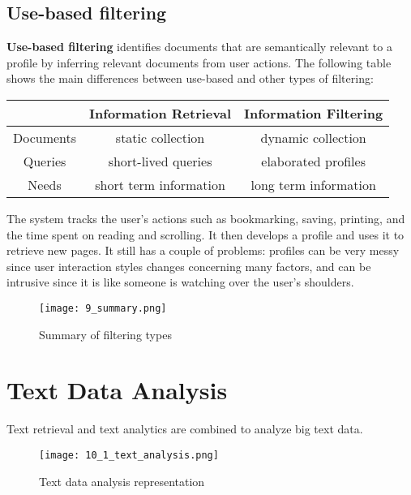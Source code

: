 \documentclass{article}
\begin{document}
\subsection{Use-based filtering}
\textbf{Use-based filtering} identifies documents that are semantically relevant to a profile by inferring relevant documents from user actions. The following table shows the main differences between use-based and other types of filtering:
\begin{center}
    \begin{table}[H]
        \begin{tabular}{c|c|c}
                      & Information Retrieval  & Information Filtering \\ \hline
            Documents & static collection      & dynamic collection    \\ \hline
            Queries   & short-lived queries    & elaborated profiles   \\ \hline
            Needs     & short term information & long term information
        \end{tabular}
    \end{table}
\end{center}
The system tracks the user's actions such as bookmarking, saving, printing, and the time spent on reading and scrolling. It then develops a profile and uses it to retrieve new pages. It still has a couple of problems: profiles can be very messy since user interaction styles changes concerning many factors, and can be intrusive since it is like someone is watching over the user's shoulders.
\begin{figure}[H]
    \centering
    \texttt{[image: 9\_summary.png]}
    \caption{Summary of filtering types}
\end{figure}

\newpage

\section{Text Data Analysis}
Text retrieval and text analytics are combined to analyze big text data.
\begin{figure}[H]
    \centering
    \texttt{[image: 10\_1\_text\_analysis.png]}
    \caption{Text data analysis representation}
\end{figure}
\end{document}

